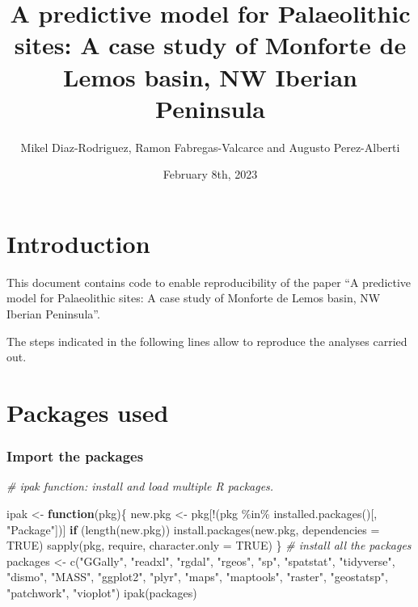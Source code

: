 \documentclass[
]{article}
\title{A predictive model for Palaeolithic sites: A case study of
Monforte de Lemos basin, NW Iberian Peninsula}
\author{Mikel Diaz-Rodriguez, Ramon Fabregas-Valcarce and Augusto
Perez-Alberti}
\date{February 8th, 2023}
\newenvironment{Shaded}{\begin{snugshade}}{\end{snugshade}}
\newcommand{\AttributeTok}[1]{\textcolor[rgb]{0.77,0.63,0.00}{#1}}
\newcommand{\CommentTok}[1]{\textcolor[rgb]{0.56,0.35,0.01}{\textit{#1}}}
\newcommand{\ConstantTok}[1]{\textcolor[rgb]{0.00,0.00,0.00}{#1}}
\newcommand{\ControlFlowTok}[1]{\textcolor[rgb]{0.13,0.29,0.53}{\textbf{#1}}}
\newcommand{\FunctionTok}[1]{\textcolor[rgb]{0.00,0.00,0.00}{#1}}
\newcommand{\NormalTok}[1]{#1}
\newcommand{\OtherTok}[1]{\textcolor[rgb]{0.56,0.35,0.01}{#1}}
\newcommand{\SpecialCharTok}[1]{\textcolor[rgb]{0.00,0.00,0.00}{#1}}
\newcommand{\StringTok}[1]{\textcolor[rgb]{0.31,0.60,0.02}{#1}}
\begin{document}
\maketitle

\hypertarget{introduction}{%
\section{Introduction}\label{introduction}}

This document contains code to enable reproducibility of the paper ``A
predictive model for Palaeolithic sites: A case study of Monforte de
Lemos basin, NW Iberian Peninsula''.

The steps indicated in the following lines allow to reproduce the
analyses carried out.

\hypertarget{packages-used}{%
\section{Packages used}\label{packages-used}}

\hypertarget{import-the-packages}{%
\subsubsection{Import the packages}\label{import-the-packages}}

\begin{Shaded}
\begin{Highlighting}[]
\CommentTok{\# ipak function: install and load multiple R packages.}

\NormalTok{ipak }\OtherTok{\textless{}{-}} \ControlFlowTok{function}\NormalTok{(pkg)\{}
\NormalTok{  new.pkg }\OtherTok{\textless{}{-}}\NormalTok{ pkg[}\SpecialCharTok{!}\NormalTok{(pkg }\SpecialCharTok{\%in\%} \FunctionTok{installed.packages}\NormalTok{()[, }\StringTok{"Package"}\NormalTok{])]}
  \ControlFlowTok{if}\NormalTok{ (}\FunctionTok{length}\NormalTok{(new.pkg)) }
    \FunctionTok{install.packages}\NormalTok{(new.pkg, }\AttributeTok{dependencies =} \ConstantTok{TRUE}\NormalTok{)}
  \FunctionTok{sapply}\NormalTok{(pkg, require, }\AttributeTok{character.only =} \ConstantTok{TRUE}\NormalTok{)}
\NormalTok{\}}
\CommentTok{\# install all the packages}
\NormalTok{packages }\OtherTok{\textless{}{-}} \FunctionTok{c}\NormalTok{(}\StringTok{"GGally"}\NormalTok{, }\StringTok{"readxl"}\NormalTok{, }\StringTok{"rgdal"}\NormalTok{, }\StringTok{"rgeos"}\NormalTok{, }\StringTok{"sp"}\NormalTok{, }\StringTok{"spatstat"}\NormalTok{, }\StringTok{"tidyverse"}\NormalTok{, }\StringTok{"dismo"}\NormalTok{, }\StringTok{"MASS"}\NormalTok{, }\StringTok{"ggplot2"}\NormalTok{, }\StringTok{"plyr"}\NormalTok{, }\StringTok{"maps"}\NormalTok{, }\StringTok{"maptools"}\NormalTok{, }\StringTok{"raster"}\NormalTok{, }\StringTok{"geostatsp"}\NormalTok{, }\StringTok{"patchwork"}\NormalTok{, }\StringTok{"vioplot"}\NormalTok{)}
\FunctionTok{ipak}\NormalTok{(packages)}
\end{Highlighting}
\end{Shaded}
\end{document}
